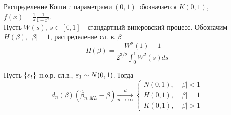 Распределение Коши с параметрами $(0,1)$ обозначается $K(0,1)$, $f(x)=\frac{1}{\pi}\frac{1}{1+x^2}$. \\
Пусть $W(s),\ s\in[0,1]$ - стандартный винеровский процесс.
Обозначим $H(\beta),\ \left\lvert \beta\right\rvert =1$, распределение сл. в. $\beta$
\[H(\beta)=\frac{W^2(1)-1}{2^{3/2}\int_0^1W^2(s)ds}\]
\begin{theorem}
    Пусть $\{\varepsilon_t\}$-н.о.р. сл.в., $\varepsilon_1\sim N(0,1)$. Тогда
    \[d_n(\beta)(\widehat{\beta}_{n,ML}-\beta)\xrightarrow[n\rightarrow\infty]{d}\begin{cases}
        N(0,1),& \left\lvert \beta\right\rvert <1 \\
        H(0,1),& \left\lvert \beta\right\rvert =1 \\
        K(0,1),& \left\lvert \beta\right\rvert >1 
    \end{cases}\]
\end{theorem}
